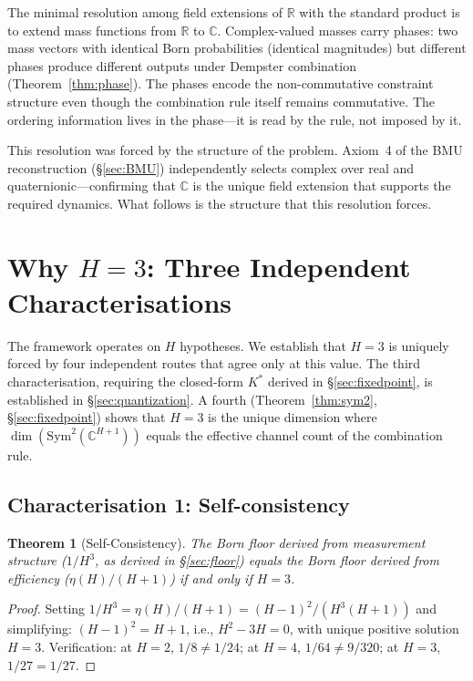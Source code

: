 \documentclass[11pt,a4paper]{article}
\newtheorem{theorem}{Theorem}[section]
\theoremstyle{definition}
\theoremstyle{remark}
\newcommand{\C}{\mathbb{C}}
\newcommand{\R}{\mathbb{R}}
\begin{document}
The minimal resolution among field extensions of $\R$ with the standard product is to extend mass functions from $\R$ to $\C$. Complex-valued masses carry phases: two mass vectors with identical Born probabilities (identical magnitudes) but different phases produce different outputs under Dempster combination (Theorem~\ref{thm:phase}). The phases encode the non-commutative constraint structure even though the combination rule itself remains commutative. The ordering information lives in the phase---it is read by the rule, not imposed by it.

This resolution was forced by the structure of the problem. Axiom~4 of the BMU reconstruction (\S\ref{sec:BMU}) independently selects complex over real and quaternionic---confirming that $\C$ is the unique field extension that supports the required dynamics. What follows is the structure that this resolution forces.


\section{Why $H=3$: Three Independent Characterisations}\label{sec:H3}

The framework operates on $H$ hypotheses. We establish that $H=3$ is uniquely forced by four independent routes that agree only at this value. The third characterisation, requiring the closed-form $K^*$ derived in \S\ref{sec:fixedpoint}, is established in \S\ref{sec:quantization}. A fourth (Theorem~\ref{thm:sym2}, \S\ref{sec:fixedpoint}) shows that $H=3$ is the unique dimension where $\dim(\mathrm{Sym}^2(\C^{H+1}))$ equals the effective channel count of the combination rule.

\subsection{Characterisation 1: Self-consistency}

\begin{theorem}[Self-Consistency]\label{thm:selfconsist}
The Born floor derived from measurement structure ($1/H^3$, as derived in \S\ref{sec:floor}) equals the Born floor derived from efficiency ($\eta(H)/(H+1)$) if and only if $H=3$.
\end{theorem}

\begin{proof}
Setting $1/H^3=\eta(H)/(H+1)=(H-1)^2/(H^3(H+1))$ and simplifying: $(H-1)^2=H+1$, i.e., $H^2-3H=0$, with unique positive solution $H=3$. Verification: at $H=2$, $1/8\neq 1/24$; at $H=4$, $1/64\neq 9/320$; at $H=3$, $1/27=1/27$.
\end{proof}
\end{document}
